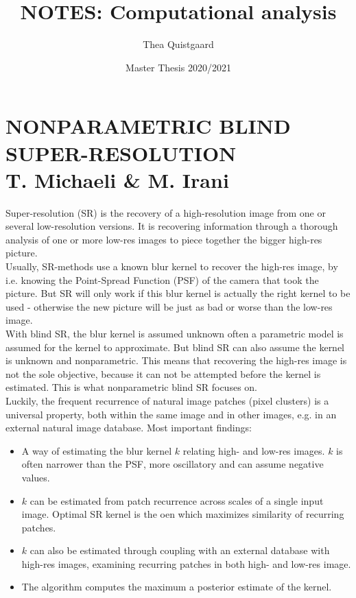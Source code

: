 \documentclass[11pt]{article}
\title{NOTES: Computational analysis}
\author{Thea Quistgaard}
\date{Master Thesis 2020/2021}
\begin{document}
\maketitle
	
\section{NONPARAMETRIC BLIND SUPER-RESOLUTION 
	\\ T. Michaeli \& M. Irani}
Super-resolution (SR) is the recovery of a high-resolution image from one or several low-resolution versions. It is recovering information through a thorough analysis of one or more low-res images to piece together the bigger high-res picture.\\
Usually, SR-methods use a known blur kernel to recover the high-res image, by i.e. knowing the Point-Spread Function (PSF) of the camera that took the picture. But SR will only work if this blur kernel is actually the right kernel to be used - otherwise the new picture will be just as bad or worse than the low-res image.\\
With blind SR, the blur kernel is assumed unknown often a parametric model is assumed for the kernel to approximate. But blind SR can also assume the kernel is unknown and nonparametric. This means that recovering the high-res image is not the sole objective, because it can not be attempted before the kernel is estimated. This is what nonparametric blind SR focuses on.\\
Luckily, the frequent recurrence of natural image patches (pixel clusters) is a universal property, both within the same image and in other images, e.g. in an external natural image database.
Most important findings:
\begin{itemize}
	\item A way of estimating the blur kernel $k$ relating high- and low-res images. $k$ is often narrower than the PSF, more oscillatory and can assume negative values.
	\item $k$ can be estimated from patch recurrence across scales of a single input image. Optimal SR kernel is the oen which maximizes similarity of recurring patches.
	\item $k$ can also be estimated through coupling with an external database with high-res images, examining recurring patches in both high- and low-res image.
	\item The algorithm computes the maximum a posterior estimate of the kernel.
\end{itemize}
\end{document}
